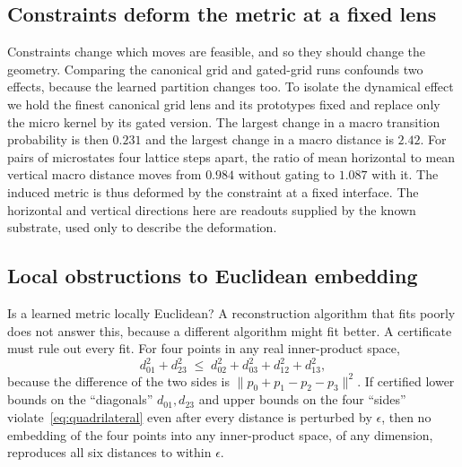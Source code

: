 \subsection{Constraints deform the metric at a fixed lens}
\label{sec:anisotropy}

Constraints change which moves are feasible, and so they should change the geometry.
Comparing the canonical grid and gated-grid runs confounds two effects, because the learned partition changes too.
To isolate the dynamical effect we hold the finest canonical grid lens and its prototypes fixed and replace only the micro kernel by its gated version.
The largest change in a macro transition probability is then $0.231$ and the largest change in a macro distance is $2.42$.
For pairs of microstates four lattice steps apart, the ratio of mean horizontal to mean vertical macro distance moves from $0.984$ without gating to $1.087$ with it.
The induced metric is thus deformed by the constraint at a fixed interface.
The horizontal and vertical directions here are readouts supplied by the known substrate, used only to describe the deformation.

\subsection{Local obstructions to Euclidean embedding}
\label{sec:nonembedding}

Is a learned metric locally Euclidean?
A reconstruction algorithm that fits poorly does not answer this, because a different algorithm might fit better.
A certificate must rule out every fit.
For four points in any real inner-product space,
\begin{equation}
d_{01}^2+d_{23}^2\;\le\;d_{02}^2+d_{03}^2+d_{12}^2+d_{13}^2,
\label{eq:quadrilateral}
\end{equation}
because the difference of the two sides is $\|p_0+p_1-p_2-p_3\|^2$.
If certified lower bounds on the ``diagonals'' $d_{01},d_{23}$ and upper bounds on the four ``sides'' violate~\eqref{eq:quadrilateral} even after every distance is perturbed by $\epsilon$, then no embedding of the four points into any inner-product space, of any dimension, reproduces all six distances to within $\epsilon$.


